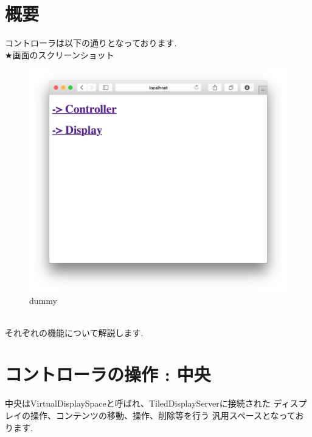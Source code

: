 \documentclass[a4paper,10pt,oneside]{jsbook}
\begin{document}
\section{概要}
コントローラは以下の通りとなっております.\\
★画面のスクリーンショット
\begin{figure}[htbp]
	\begin{center}
		\includegraphics[width=11.5cm]{image/home.png}
	\end{center}
	\caption{dummy}
	\label{fig:home}
\end{figure}
\\

それぞれの機能について解説します.\\

\newpage

\section{コントローラの操作 : 中央}
中央はVirtualDisplaySpaceと呼ばれ、TiledDisplayServerに接続された
ディスプレイの操作、コンテンツの移動、操作、削除等を行う
汎用スペースとなっております.\\
\end{document}

